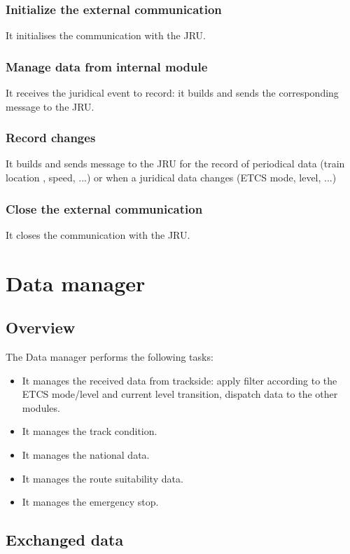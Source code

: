 \documentclass[nocc]{template/openetcs_report}
\begin{document}
\subsection{Initialize the external communication}
It initialises the communication with the JRU.
\subsection{Manage data from internal module}
It receives the juridical event to record: it builds and sends the corresponding message to the JRU.
\subsection{Record changes}
It builds and sends message to the JRU for the record of periodical data (train location , speed, ...) or when a juridical data changes (ETCS mode, level, ...)
\subsection{Close the external communication}
It closes the communication with the JRU.
\chapter{Data manager}
\section{Overview}
The Data manager performs the following tasks:
\begin{itemize}
\item	It manages the received data from trackside: apply filter according to the ETCS mode/level and current level transition, dispatch data to the other modules.
\item	It manages the track condition.
\item	It manages the national data.
\item	It manages the route suitability data.
\item	It manages the emergency stop.
\end{itemize}

\section{Exchanged data}
\end{document}
